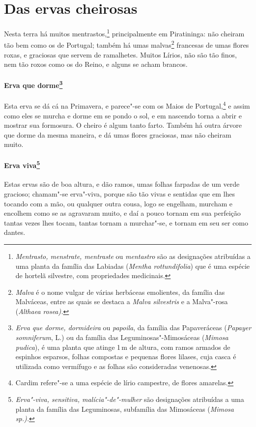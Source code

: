 \section{Das ervas cheirosas}
Nesta terra há muitos mentrastos,\footnote{ \textit{Mentrasto,
menstrate, mentraste} ou \textit{mentastro} são as designações
atribuídas a uma planta da família das Labiadas (\textit{Mentha
rottundifolia}) que é uma espécie de hortelã silvestre, com
propriedades medicinais.} principalmente em Piratininga: não cheiram
tão bem como os de Portugal; também há umas malvas\footnote{ \textit{Malva} 
é o nome vulgar de várias herbáceas emolientes, da
família das Malváceas, entre as quais se destaca a \textit{Malva
silvestris} e a Malva"-rosa (\textit{Althaea rosea).}} francesas de umas
flores roxas, e graciosas que servem de ramalhetes. Muitos Lírios, não
são tão finos, nem tão roxos como os do Reino, e alguns se acham brancos.

\paragraph{Erva que dorme\footnote{ \textit{Erva que dorme, dormideira}
ou \textit{papoila}, da família das Papaveráceas (\textit{Papayer
somniferum}, L.) ou da família das Leguminosas"-Mimosáceas
(\textit{Mimosa pudica}), é uma planta que atinge 1\,m de altura, com
ramos armados de espinhos esparsos, folhas compostas e pequenas flores
lilases, cuja casca é utilizada como vermífugo e as folhas são
consideradas venenosas.}} Esta erva se dá cá na Primavera, e
parece"-se com os Maios de Portugal,\footnote{ Cardim refere"-se a uma
espécie de lírio campestre, de flores amarelas.} e assim como eles se
murcha e dorme em se pondo o sol, e em nascendo torna a abrir e mostrar
sua formosura. O cheiro é algum tanto farto. Também há outra árvore que
dorme da mesma maneira, e dá umas flores graciosas, mas não cheiram muito.

\paragraph{Erva viva\footnote{ \textit{Erva"-viva, sensitiva,
malícia"-de"-mulher} são designações atribuídas a uma planta da família 
das Leguminosas, subfamília das Mimosáceas (\textit{Mimosa
sp.).}}} Estas ervas são de boa altura, e dão ramos, umas
folhas farpadas de um verde gracioso; chamam"-se erva"-viva, porque são
tão vivas e sentidas que em lhes tocando com a mão, ou qualquer outra
cousa, logo se engelham, murcham e encolhem como se as agravaram muito,
e daí a pouco tornam em sua perfeição tantas vezes lhes tocam, tantas
tornam a murchar"-se, e tornam em seu ser como dantes.

